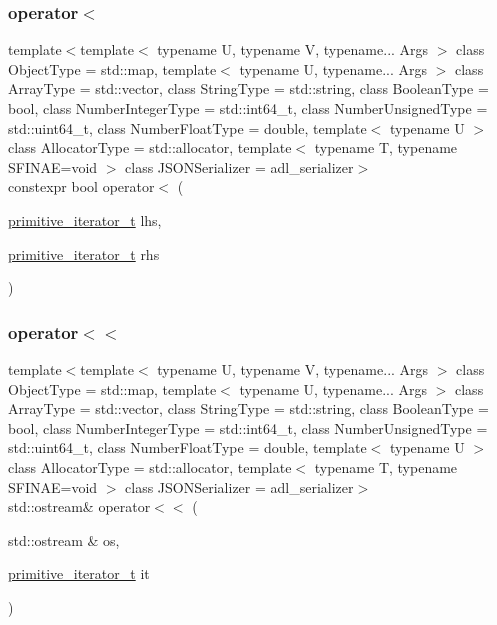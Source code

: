 \subsubsection{\texorpdfstring{operator$<$}{operator<}}
{\footnotesize\ttfamily template$<$template$<$ typename U, typename V, typename... Args $>$ class Object\+Type = std\+::map, template$<$ typename U, typename... Args $>$ class Array\+Type = std\+::vector, class String\+Type  = std\+::string, class Boolean\+Type  = bool, class Number\+Integer\+Type  = std\+::int64\+\_\+t, class Number\+Unsigned\+Type  = std\+::uint64\+\_\+t, class Number\+Float\+Type  = double, template$<$ typename U $>$ class Allocator\+Type = std\+::allocator, template$<$ typename T, typename S\+F\+I\+N\+A\+E=void $>$ class J\+S\+O\+N\+Serializer = adl\+\_\+serializer$>$ \\
constexpr bool operator$<$ (\begin{DoxyParamCaption}\item[{\hyperlink{classnlohmann_1_1basic__json_1_1primitive__iterator__t}{primitive\+\_\+iterator\+\_\+t}}]{lhs,  }\item[{\hyperlink{classnlohmann_1_1basic__json_1_1primitive__iterator__t}{primitive\+\_\+iterator\+\_\+t}}]{rhs }\end{DoxyParamCaption})\hspace{0.3cm}{\ttfamily [friend]}}

\mbox{\label{classnlohmann_1_1basic__json_1_1primitive__iterator__t_a653e8be3b4fb047e8b4460cd932f2b52}} 
\subsubsection{\texorpdfstring{operator$<$$<$}{operator<<}}
{\footnotesize\ttfamily template$<$template$<$ typename U, typename V, typename... Args $>$ class Object\+Type = std\+::map, template$<$ typename U, typename... Args $>$ class Array\+Type = std\+::vector, class String\+Type  = std\+::string, class Boolean\+Type  = bool, class Number\+Integer\+Type  = std\+::int64\+\_\+t, class Number\+Unsigned\+Type  = std\+::uint64\+\_\+t, class Number\+Float\+Type  = double, template$<$ typename U $>$ class Allocator\+Type = std\+::allocator, template$<$ typename T, typename S\+F\+I\+N\+A\+E=void $>$ class J\+S\+O\+N\+Serializer = adl\+\_\+serializer$>$ \\
std\+::ostream\& operator$<$$<$ (\begin{DoxyParamCaption}\item[{std\+::ostream \&}]{os,  }\item[{\hyperlink{classnlohmann_1_1basic__json_1_1primitive__iterator__t}{primitive\+\_\+iterator\+\_\+t}}]{it }\end{DoxyParamCaption})\hspace{0.3cm}{\ttfamily [friend]}}

